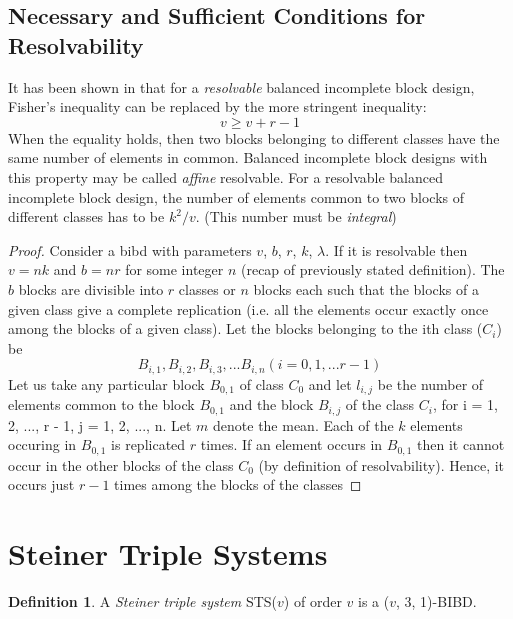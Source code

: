 \documentclass[12pt]{article}
\theoremstyle{definition}
\newtheorem{mydef}{Definition}
\begin{document}
\subsection{Necessary and Sufficient Conditions for Resolvability}
It has been shown in \cite{Bose} that for a \textit{resolvable} balanced incomplete block design, Fisher's inequality can be replaced by the more stringent inequality: 
\begin{equation}
v \geq v + r - 1
\end{equation}
When the equality holds, then two blocks belonging to different classes have the same number of elements in common. Balanced incomplete block designs with this property may be called \textit{affine} resolvable. 
For a resolvable balanced incomplete block design, the number of elements common to two blocks of different classes has to be $k^{2}/v$. (This number must be \textit{integral})
\begin{proof}
Consider a bibd with parameters $v$, $b$, $r$, $k$, $\lambda$. If it is resolvable then $v = nk$ and $b = nr$ for some integer $n$ (recap of previously stated definition). The $b$ blocks are divisible into $r$ classes or $n$ blocks each such that the blocks of a given class give a complete replication (i.e. all the elements occur exactly once among the blocks of a given class). Let the blocks belonging to the ith class ($C_i$) be 
\begin{equation}
B_{i,1}, B_{i,2}, B_{i,3}, ... B_{i, n} (i = 0, 1, ... r-1)
\end{equation}
Let us take any particular block $B_{0,1}$ of class $C_0$ and let $l_{i, j}$ be the number of elements common to the block $B_{0,1}$ and the block $B_{i,j}$ of the class $C_i$, for i = 1, 2, ..., r - 1, j = 1, 2, ..., n. Let $m$ denote the mean.
Each of the $k$ elements occuring in $B_{0,1}$ is replicated $r$ times. If an element occurs in $B_{0,1}$ then it cannot occur in the other blocks of the class $C_0$ (by definition of resolvability). Hence, it occurs just $r-1$ times among the blocks of the classes 
\end{proof}
\section{Steiner Triple Systems}
\begin{mydef}
A \textit{Steiner triple system} STS($v$) of order $v$ is a ($v$, 3, 1)-BIBD.
\end{mydef}

\clearpage


{}

\end{document}
